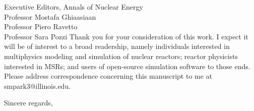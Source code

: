 \documentclass[11pt]{letter} %
\begin{document}
\begin{letter}{Executive Editors,
Annals of Nuclear Energy\\
Professor Mostafa Ghiaasiaan\\
Professor Piero Ravetto\\
Professor Sara Pozzi}
Thank you for your consideration of this work. I expect it will be of interest
to a broad readership, namely individuals interested in multiphysics modeling
and simulation of nuclear reactors; reactor physicists interested in MSRs; and
users of open-source simulation software to those ends. Please address
correspondence concerning this manuscript to me at \mbox{smpark3@illinois.edu}.

\closing{\hspace{3cm} Sincere regards,}


\end{letter}
\end{document}
